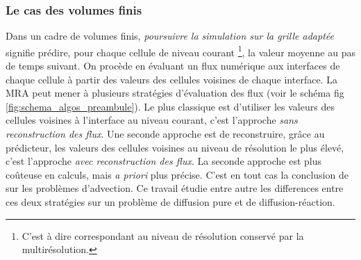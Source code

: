 \subsubsection{Le cas des volumes finis}
Dans un cadre de volumes finis, \emph{poursuivre la simulation sur la grille adaptée} signifie prédire, pour chaque cellule de niveau courant
\footnote{C'est à dire correspondant au niveau de résolution conservé par la multirésolution.}, 
la valeur moyenne au pas de temps suivant. On procède en évaluant un flux numérique aux interfaces de chaque cellule à partir des valeurs des cellules voisines de chaque interface.
La MRA peut mener à plusieurs stratégies d'évaluation des flux (voir le schéma fig \ref{fig:schema_algos_preambule}). 
Le plus classique est d'utiliser les valeurs des cellules voisines à l’interface au niveau courant, c'est l'approche \emph{sans reconstruction des flux}.
Une seconde approche est de reconstruire, grâce au prédicteur, les valeurs des cellules voisines au niveau de résolution le plus élevé, c'est l'approche \emph{avec reconstruction des flux}.
La seconde approche est plus coûteuse en calculs, mais \emph{a priori} plus précise. C'est en tout cas la conclusion de \cite{belloti_et_al_2025} sur les problèmes d’advection.
Ce travail étudie entre autre les differences entre ces deux stratégies sur un problème de diffusion pure et de diffusion-réaction. 
